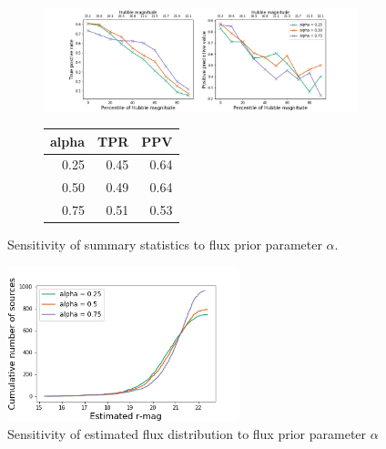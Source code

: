 \begin{figure}[ht]
\begin{subfigure}{\textwidth}
\centering
\includegraphics[width = \textwidth]{figures/prior_alpha_sensitivty.png}
\end{subfigure}
\begin{subfigure}{\textwidth}
\begin{center}
\begin{tabular}{rrr}
\toprule
 alpha &   TPR &   PPV \\
\midrule
  0.25 &  0.45 &  0.64 \\
  0.50 &  0.49 &  0.64 \\
  0.75 &  0.51 &  0.53 \\
\bottomrule
\end{tabular}
\par\vspace{0pt}
\end{center}
\end{subfigure}\hfill
\caption{Sensitivity of summary statistics to flux prior parameter $\alpha$. }
\end{figure}

\begin{figure}
    \centering
    \includegraphics[width = 0.6\textwidth]{figures/sensitivity_cdf_fluxes.png}
    \caption{Sensitivity of estimated flux distribution to flux prior parameter $\alpha$}
    \label{fig:cdf_sensitivity}
\end{figure}